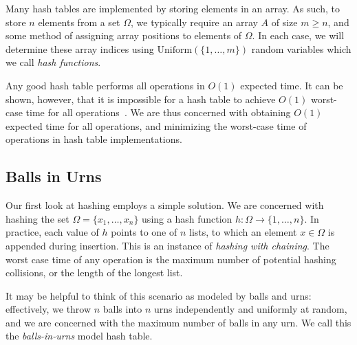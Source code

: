 Many hash tables are implemented by storing elements in an array. As
such, to store $n$ elements from a set $\Omega$, we typically require
an array $A$ of size $m \geq n$, and some method of assigning array
positions to elements of $\Omega$. In each case, we will determine
these array indices using $\text{Uniform}(\{1, \ldots, m\})$ random
variables which we call \emph{hash functions}.


Any good hash table performs all operations in $O(1)$ expected
time. It can be shown, however, that it is impossible for a hash table
to achieve $O(1)$ worst-case time for all
operations~\cite{dietzfelbinger:perfecthashing}. We are thus concerned
with obtaining $O(1)$ expected time for all operations, and minimizing
the worst-case time of operations in hash table implementations.

%
%
%

\subsection{Balls in Urns}

Our first look at hashing employs a simple solution. We are concerned
with hashing the set $\Omega = \{x_1, \ldots, x_n\}$ using a hash
function $h : \Omega \to \{1, \ldots, n\}$. In practice, each value of
$h$ points to one of $n$ lists, to which an element $x \in \Omega$ is
appended during insertion. This is an instance of \emph{hashing with
  chaining}. The worst case time of any operation is the maximum
number of potential hashing collisions, or the length of the longest
list.

It may be helpful to think of this scenario as modeled by balls and
urns: effectively, we throw $n$ balls into $n$ urns independently and
uniformly at random, and we are concerned with the maximum number of
balls in any urn. We call this the \emph{balls-in-urns} model hash
table.

